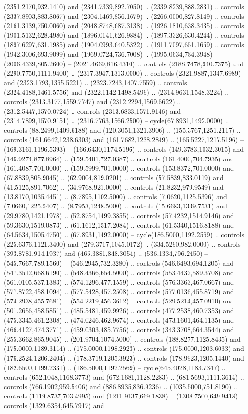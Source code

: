 (2351.2170,932.1410) and (2341.7339,892.7050) .. (2339.8239,888.2831) .. controls (2337.8903,883.8067) and (2304.1469,856.1679) .. (2266.0000,827.8149) .. controls (2161.3139,750.0060) and (2048.8748,687.3138) .. (1926.1810,638.3435) .. controls (1901.5132,628.4980) and (1896.0141,626.9884) .. (1897.3326,630.4244) .. controls (1897.6297,631.1985) and (1904.0993,640.5322) .. (1911.7097,651.1659) .. controls (1942.3006,693.9099) and (1969.0724,736.7008) .. (1995.0634,784.3948) -- (2006.4339,805.2600) -- (2021.4669,816.4310) .. controls (2188.7478,940.7375) and (2290.7750,1111.9400) .. (2317.3947,1313.0000) .. controls (2321.9887,1347.6989) and (2323.1793,1365.5221) .. (2323.7243,1407.7559) .. controls (2324.4188,1461.5756) and (2322.1142,1498.5499) .. (2314.9631,1548.3224) .. controls (2313.3177,1559.7747) and (2312.2294,1569.5622) .. (2312.5447,1570.0724) .. controls (2313.6833,1571.9146) and (2314.7899,1570.9151) .. (2316.7763,1566.2500) -- cycle(67.8931,1492.0000) .. controls (88.2499,1409.6188) and (120.3051,1321.3906) .. (155.3767,1251.2117) .. controls (161.6642,1238.6303) and (161.7682,1238.2849) .. (165.5227,1217.5196) -- (169.3161,1196.5393) -- (166.6430,1174.5196) .. controls (149.3783,1032.3015) and (146.9274,877.8964) .. (159.5401,727.0387) .. controls (161.4000,704.7935) and (161.4087,701.0000) .. (159.5999,701.0000) .. controls (153.8372,701.0000) and (67.8839,805.9045) .. (62.9004,819.0201) .. controls (57.5839,833.0119) and (41.5125,891.7062) .. (34.9768,921.0000) .. controls (21.8232,979.9549) and (13.8170,1035.4451) .. (8.7895,1102.5000) .. controls (7.0620,1125.5396) and (7.0660,1225.5407) .. (8.7953,1248.5000) .. controls (15.6683,1339.7531) and (29.9780,1421.1978) .. (52.8754,1499.3855) .. controls (57.4232,1514.9146) and (59.3630,1519.0873) .. (61.1612,1517.2084) .. controls (61.5340,1516.8188) and (64.5634,1505.4750) .. (67.8931,1492.0000) -- cycle(186.5000,1192.2569) .. controls (225.6376,1121.3400) and (279.3717,1045.0172) .. (334.5290,982.0000) .. controls (393.8781,914.1937) and (465.3881,848.3054) .. (536.1334,796.2450) -- (545.7667,789.1560) -- (546.2945,732.3280) .. controls (546.6493,694.1205) and (547.3512,668.6190) .. (548.4366,654.5000) .. controls (553.4432,589.3708) and (561.0105,537.1383) .. (574.1296,477.1559) .. controls (576.3363,467.0667) and (577.8722,458.1094) .. (577.5428,457.2508) .. controls (577.0136,455.8719) and (574.2938,455.7681) .. (554.2219,456.3612) .. controls (529.5214,457.0910) and (501.2656,458.5851) .. (485.5481,459.9926) .. controls (477.2538,460.7353) and (475.3345,461.2308) .. (474.0246,462.9674) .. controls (473.1601,464.1135) and (466.4127,474.3771) .. (459.0303,485.7756) .. controls (343.3708,664.3544) and (255.3662,865.9045) .. (201.9704,1074.5000) .. controls (188.8277,1125.8435) and (175.0000,1189.3114) .. (175.0000,1198.2923) .. controls (175.0000,1203.6033) and (176.2524,1206.2404) .. (178.3719,1205.3923) .. controls (178.9923,1205.1440) and (182.6500,1199.2331) .. (186.5000,1192.2569) -- cycle(645.4028,1183.7347) .. controls (652.1048,1168.3773) and (672.1681,1128.2283) .. (681.5693,1111.3614) .. controls (766.1902,959.5406) and (886.8935,836.9236) .. (1035.5000,751.8190) .. controls (1119.8737,703.4995) and (1211.9137,669.1838) .. (1308.7500,649.9418) .. controls (1329.6354,645.7917) and 